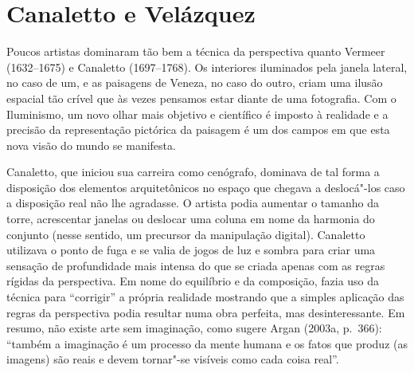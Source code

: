 \chapter{Canaletto e Velázquez}

Poucos artistas dominaram tão bem a técnica da perspectiva quanto
Vermeer (1632--1675) e Canaletto (1697--1768). Os interiores iluminados
pela janela lateral, no caso de um, e as paisagens de Veneza, no caso do
outro, criam uma ilusão espacial tão crível que às vezes pensamos estar
diante de uma fotografia. Com o Iluminismo, um novo olhar mais objetivo
e científico é imposto à realidade e a precisão da representação
pictórica da paisagem é um dos campos em que esta nova visão do mundo se
manifesta.

Canaletto, que iniciou sua carreira como cenógrafo, dominava de tal
forma a disposição dos elementos arquitetônicos no espaço que chegava a
deslocá"-los caso a disposição real não lhe agradasse. O artista podia
aumentar o tamanho da torre, acrescentar janelas ou deslocar uma coluna
em nome da harmonia do conjunto (nesse sentido, um precursor da
manipulação digital). Canaletto utilizava o ponto de fuga e se valia de
jogos de luz e sombra para criar uma sensação de profundidade mais
intensa do que se criada apenas com as regras rígidas da perspectiva. Em
nome do equilíbrio e da composição, fazia uso da técnica para
``corrigir'' a própria realidade mostrando que a simples aplicação das
regras da perspectiva podia resultar numa obra perfeita, mas
desinteressante. Em resumo, não existe arte sem imaginação, como sugere
Argan (2003a, p.~366): ``também a imaginação é um processo da mente
humana e os fatos que produz (as imagens) são reais e devem tornar"-se
visíveis como cada coisa real''.

